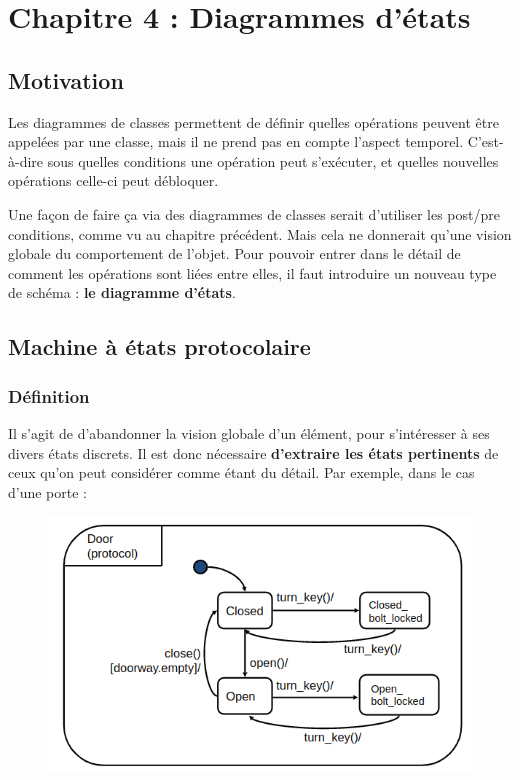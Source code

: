 \documentclass[../Syllabus.tex]{subfiles}
\begin{document}
\section{Chapitre 4 : Diagrammes d'états}

\subsection{Motivation}

Les diagrammes de classes permettent de définir quelles opérations peuvent être appelées par une classe, mais il ne prend pas en compte l'aspect temporel. C'est-à-dire sous quelles conditions une opération peut s'exécuter, et quelles nouvelles opérations celle-ci peut débloquer.

Une façon de faire ça via des diagrammes de classes serait d'utiliser les post/pre conditions, comme vu au chapitre précédent. Mais cela ne donnerait qu'une vision globale du comportement de l'objet. Pour pouvoir entrer dans le détail de comment les opérations sont liées entre elles, il faut introduire un nouveau type de schéma : \textbf{le diagramme d'états}.

\subsection{Machine à états protocolaire}

\subsubsection{Définition}

Il s'agit de d'abandonner la vision globale d'un élément, pour s'intéresser à ses divers états discrets. Il est donc nécessaire \textbf{d'extraire les états pertinents} de ceux qu'on peut considérer comme étant du détail. Par exemple, dans le cas d'une porte :

\begin{figure}
    \includegraphics[scale=0.35]{img/exempleProtoStateMachine.png}
\end{figure}
\end{document}
